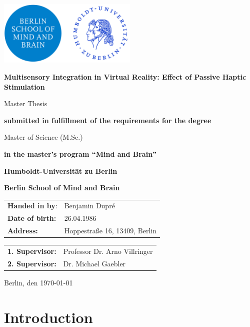 \documentclass[12pt,oneside,openright]{report}
\begin{document}
\begin{titlepage}
    \centering
    \includegraphics[width=0.5\textwidth]{Hu-logo.png}
    \vspace{2cm}
    
    {\huge \textbf{Multisensory Integration in Virtual Reality: Effect of Passive Haptic Stimulation}\par}
    \vspace{2cm}
    {\LARGE Master Thesis\par}
    \vspace{0.5cm}
    {\textbf{submitted in fulfillment of the requirements for the degree}\par}
    Master of Science (M.Sc.)\par
    {\textbf{in the master's program ``Mind and Brain''}\par}
    \vspace{1.5cm}
    {\textbf{Humboldt-Universität zu Berlin}\par}
    {\textbf{Berlin School of Mind and Brain}\par}
    \vfill
    \raggedright
    \begin{tabular}{ll}
        \textbf{Handed in by}: & Benjamin Dupré \\
        \textbf{Date of birth:} & 26.04.1986\\
       \textbf{ Address:} & Hoppestraße 16, 13409, Berlin \\
    \end{tabular}
    \vfill
    \begin{tabular}{ll}
        \textbf{1. Supervisor:}& Professor Dr. Arno Villringer \\
        \textbf{2. Supervisor:}& Dr. Michael Gaebler  \\
    \end{tabular}
    \vfill
    {Berlin, den \today \par}
\end{titlepage}

\section*{Introduction}
\end{document}
